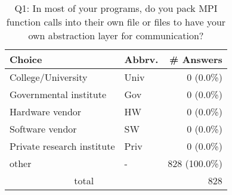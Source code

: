 \begin{table}[htb]%
\begin{center}%
\caption{Q1: In most of your programs, do you pack MPI function calls into their own file or files to have your own abstraction layer for communication?}%
\label{tab:Q1-ans}%
\begin{tabular}{l|l|r}%
\hline%
Choice & Abbrv. & \# Answers \\%
\hline%
College/University & Univ & 0 (0.0\%) \\%
Governmental institute & Gov & 0 (0.0\%) \\%
Hardware vendor & HW & 0 (0.0\%) \\%
Software vendor & SW & 0 (0.0\%) \\%
Private research institute & Priv & 0 (0.0\%) \\%
other & - & 828 (100.0\%) \\%
\hline%
\multicolumn{2}{c}{total} & 828 \\%
\hline%
\end{tabular}%
\end{center}%
\end{table}%
